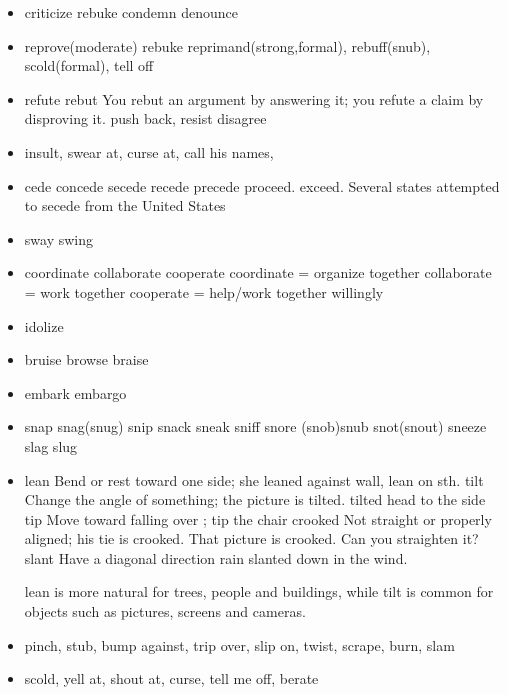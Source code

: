 \documentclass[a4paper,11pt,twoside]{book}
\begin{document}
\begin{itemize}
	\item criticize rebuke condemn denounce 
	
	\item reprove(moderate) rebuke reprimand(strong,formal), rebuff(snub), scold(formal), tell off
	
	\item refute rebut  You rebut an argument by answering it; you refute a claim by disproving it. push back, resist disagree
	
	\item insult, swear at, curse at, call his names, 

	\item cede concede secede recede precede proceed. exceed.  Several states attempted to secede from the United States

	\item sway swing
	
	\item coordinate collaborate cooperate 
	coordinate = organize together
	collaborate = work together
	cooperate = help/work together willingly
	
	\item idolize
	
	\item bruise browse braise

	\item embark embargo

	\item snap snag(snug) snip snack sneak sniff snore (snob)snub snot(snout) sneeze slag slug

	\item lean Bend or rest toward one side;  she leaned against wall, lean on sth.
	 tilt Change the angle of something;  the picture is tilted. tilted head to the side
	 tip Move toward falling over ; tip the chair
	 crooked Not straight or properly aligned; his tie is crooked. That picture is crooked. Can you straighten it?
	 slant Have a diagonal direction rain slanted down in the wind. 
	 
	 lean is more natural for trees, people and buildings, while tilt is common for objects such as pictures, screens and cameras.
	 
	\item pinch, stub, bump against, trip over,  slip on,  twist, scrape,  burn, slam 

	\item scold, yell at, shout at, curse, tell me off, berate
	

\end{itemize}
\end{document}

